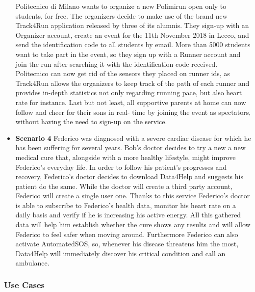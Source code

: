 \documentclass[titlepage]{article}
\begin{document}
\begin{itemize}
					Politecnico di Milano wants to organize a new Polimirun open only to students, for free. The 						organizers decide to make use of the brand new Track4Run application released by three of its 					alumnis. They sign-up with an Organizer account, create an event for the 11th November 2018 in 					Lecco, and send the identification code to all students by email. More than 5000 students want to 					take part in the event, so they sign up with a Runner account and join the run after searching it with 					the identification code received.
					Politecnico can now get rid of the sensors they placed on runner ids, as Track4Run allows the 						organizers to keep track of the path of each runner and provides in-depth statistics not only 						regarding running pace, but also heart rate for instance. 
					Last but not least, all supportive parents at home can now follow and cheer for their sons in real-					time by joining the event as spectators, without having the need to sign-up on the service.
					\item {\bf Scenario 4} \linebreak
					Federico was diagnosed with a severe cardiac disease for which he has been suffering for several 					years. Bob’s doctor decides to try a new a new medical cure that, alongside with a more healthy 					lifestyle, might improve Federico’s everyday life. In order to follow his patient’s progresses and 						recovery, Federico’s doctor decides to download Data4Help and suggests his patient do the same. 					While the doctor will create a third party account, Federico will create a single user one. Thanks to 					this service Federico’s doctor is able to subscribe to Federico’s health data, monitor his heart rate 					on a daily basis and verify if he is increasing his active energy. All this gathered data will help him 					establish whether the cure shows any results and will allow Federico to feel safer when moving 					around. Furthermore Federico can also activate AutomatedSOS, so, whenever his disease 						threatens him the most, Data4Help will immediately discover his critical condition and call an 						ambulance.
				\end{itemize}	
			
		\subsubsection{Use Cases}
		
		
\end{document}
